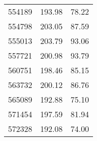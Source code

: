 \documentclass[main.tex]{subfiles}
\begin{document}
\begin{longtable}{ccc}
		554189     & 193.98       & 78.22        \\
		554798     & 203.05       & 87.59        \\
		555013     & 203.79       & 93.06        \\
		557721     & 200.98       & 93.79        \\
		560751     & 198.46       & 85.15        \\
		563732     & 200.12       & 86.76        \\
		565089     & 192.88       & 75.10        \\
		571454     & 197.59       & 81.94        \\
		572328     & 192.08       & 74.00       
	\end{longtable}
\end{document}
